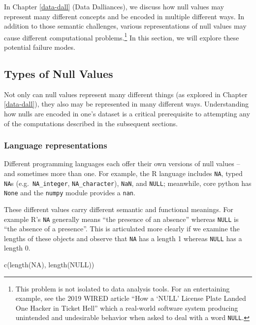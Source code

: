 \documentclass[
]{krantz}
\makeatletter
\newenvironment{Shaded}{\begin{snugshade}}{\end{snugshade}}
\newcommand{\ConstantTok}[1]{\textcolor[rgb]{0,0,0}{#1}}
\newcommand{\FunctionTok}[1]{\textcolor[rgb]{0,0,0}{#1}}
\newcommand{\NormalTok}[1]{#1}
\newenvironment{kframe}{%
\medskip{}
\setlength{\fboxsep}{.8em}
 \def\at@end@of@kframe{}%
 \ifinner\ifhmode%
  \def\at@end@of@kframe{\end{minipage}}%
  \begin{minipage}{\columnwidth}%
 \fi\fi%
 \def\FrameCommand##1{\hskip\@totalleftmargin \hskip-\fboxsep
 \colorbox{shadecolor}{##1}\hskip-\fboxsep
     \hskip-\linewidth \hskip-\@totalleftmargin \hskip\columnwidth}%
 \MakeFramed {\advance\hsize-\width
   \@totalleftmargin\z@ \linewidth\hsize
   \@setminipage}}%
 {\par\unskip\endMakeFramed%
 \at@end@of@kframe}
\renewenvironment{Shaded}{\begin{kframe}}{\end{kframe}}
\makeatother
\begin{document}
In Chapter \ref{data-dall} (Data Dalliances), we discuss how null values may represent many different concepts and be encoded in multiple different ways.
In addition to those semantic challenges, various representations of null values may cause different computational problems.\footnote{This problem is not isolated to data analysis tools. For an entertaining example, see the 2019 WIRED article ``How a `NULL' License Plate Landed One Hacker in Ticket Hell'' \citep{barrett} which a real-world software system producing unintended and undesirable behavior when asked to deal with a word \texttt{\textquotesingle{}NULL\textquotesingle{}}.}
In this section, we will explore these potential failure modes.

\hypertarget{types-of-null-values}{%
\subsection{Types of Null Values}\label{types-of-null-values}}

Not only can null values represent many different things (as explored in Chapter \ref{data-dall}), they also may be represented in many different ways. Understanding how nulls are encoded in one's dataset is a critical prerequisite to attempting any of the computations described in the subsequent sections.

\hypertarget{language-representations}{%
\subsubsection{Language representations}\label{language-representations}}

Different programming languages each offer their own versions of null values -- and sometimes more than one. For example, the R language includes \texttt{NA}, typed \texttt{NA}s (e.g.~\texttt{NA\_integer}, \texttt{NA\_character}), \texttt{NaN}, and \texttt{NULL}; meanwhile, core python has \texttt{None} and the \texttt{numpy} module provides a \texttt{nan}.

These different values carry different semantic and functional meanings. For example R's \texttt{NA} generally means ``the presence of an absence'' whereas \texttt{NULL} is ``the absence of a presence''. This is articulated more clearly if we examine the lengths of these objects and observe that \texttt{NA} has a length 1 whereas \texttt{NULL} has a length 0.

\begin{Shaded}
\begin{Highlighting}[]
\FunctionTok{c}\NormalTok{(}\FunctionTok{length}\NormalTok{(}\ConstantTok{NA}\NormalTok{), }\FunctionTok{length}\NormalTok{(}\ConstantTok{NULL}\NormalTok{))}
\end{Highlighting}
\end{Shaded}
\end{document}
